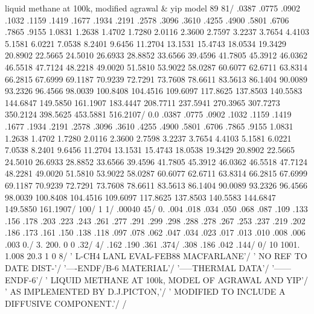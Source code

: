 \small
\begin{ccode}

liquid methane at 100k, modified agrawal & yip model
  89  81/
  .0387  .0775  .0902  .1032  .1159
   .1419  .1677  .1934  .2191  .2578  .3096 .3610
   .4255  .4900  .5801  .6706  .7865  .9155  1.0831
   1.2638  1.4702  1.7280  2.0116  2.3600  2.7597  3.2237
   3.7654  4.4103  5.1581  6.0221  7.0538  8.2401  9.6456
   11.2704  13.1531  15.4743  18.0534  19.3429  20.8902 22.5665
   24.5010  26.6933  28.8852  33.6566  39.4596  41.7805  45.3912
   46.0362  46.5518  47.7124  48.2218  49.0020  51.5810  53.9022
   58.0287  60.6077  62.6711  63.8314  66.2815  67.6999  69.1187
   70.9239  72.7291  73.7608  78.6611  83.5613  86.1404  90.0089
   93.2326  96.4566  98.0039  100.8408  104.4516  109.6097  117.8625
   137.8503  140.5583  144.6847  149.5850  161.1907  183.4447  208.7711
   237.5941  270.3965  307.7273  350.2124  398.5625  453.5881 516.2107/
  0.0  .0387  .0775  .0902
   .1032  .1159  .1419  .1677  .1934  .2191  .2578
   .3096  .3610  .4255  .4900  .5801  .6706  .7865
   .9155  1.0831  1.2638  1.4702  1.7280  2.0116  2.3600
   2.7598  3.2237  3.7654  4.4103  5.1581  6.0221  7.0538
   8.2401  9.6456  11.2704  13.1531  15.4743  18.0538  19.3429
   20.8902  22.5665  24.5010  26.6933  28.8852  33.6566  39.4596
   41.7805  45.3912  46.0362  46.5518  47.7124  48.2281  49.0020
   51.5810  53.9022  58.0287  60.6077  62.6711  63.8314  66.2815
   67.6999  69.1187  70.9239  72.7291  73.7608  78.6611  83.5613
   86.1404  90.0089  93.2326  96.4566  98.0039  100.8408  104.4516
   109.6097  117.8625  137.8503  140.5583  144.6847  149.5850 161.1907/
 100/
 1 1/
 .00040 45/
 0. .004 .018 .034 .050 .068 .087 .109
   .133 .156 .178 .203 .223 .243 .261 .277 .291 .299
   .298 .288 .278 .267 .253 .237 .219 .202 .186 .173
   .161 .150 .138 .118 .097 .078 .062 .047 .034 .023
   .017 .013 .010 .008 .006 .003 0./
 3. 200. 0 0 .32/
 4/
  .162 .190 .361 .374/
  .308 .186 .042 .144/
 0/
 10 1001. 1.008 20.3 1 0 8/
' L-CH4     LANL       EVAL-FEB88 MACFARLANE'/
' NO REF TO DATE       DIST-'/
'----ENDF/B-6          MATERIAL'/
'-----THERMAL DATA'/
'------ENDF-6'/
' LIQUID METHANE AT 100k, MODEL OF AGRAWAL AND YIP'/
' AS IMPLEMENTED BY D.J.PICTON,'/
'  MODIFIED TO INCLUDE A DIFFUSIVE COMPONENT.'/
/

\end{ccode}
\normalsize

